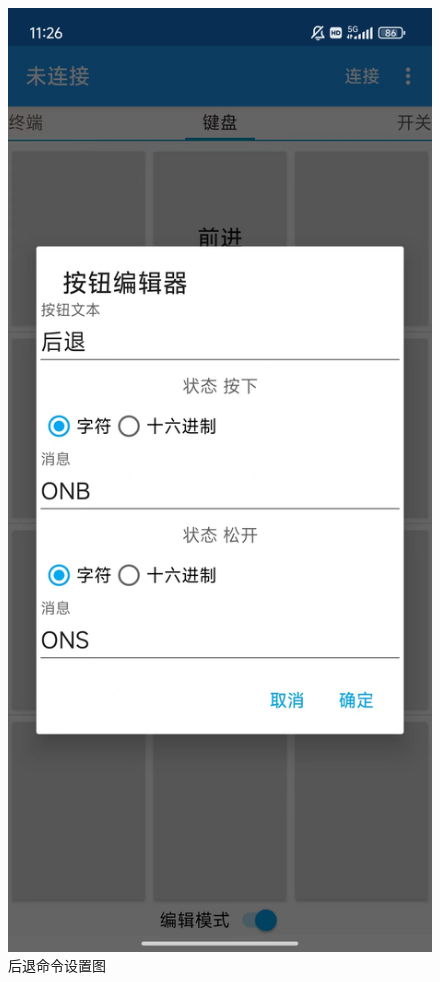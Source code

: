 \begin{figure}[htbp]
\begin{minipage}{0.49\linewidth}
		\includegraphics[width=0.6\linewidth]{figures/后退命令设置.jpg}
		\caption{后退命令设置图}
		\label{后退命令设置}%
	\end{minipage}
	

\end{figure}
